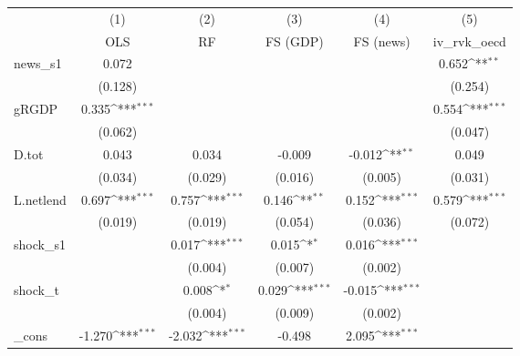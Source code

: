 {
\def\sym#1{\ifmmode^{#1}\else\(^{#1}\)\fi}
\begin{tabular}{l*{5}{c}}
\toprule
            &\multicolumn{1}{c}{(1)}&\multicolumn{1}{c}{(2)}&\multicolumn{1}{c}{(3)}&\multicolumn{1}{c}{(4)}&\multicolumn{1}{c}{(5)}\\
            &\multicolumn{1}{c}{OLS}&\multicolumn{1}{c}{RF}&\multicolumn{1}{c}{FS (GDP)}&\multicolumn{1}{c}{FS (news)}&\multicolumn{1}{c}{iv\_rvk\_oecd}\\
\midrule
news\_s1     &       0.072         &                     &                     &                     &       0.652\sym{**} \\
            &     (0.128)         &                     &                     &                     &     (0.254)         \\
\addlinespace
gRGDP       &       0.335\sym{***}&                     &                     &                     &       0.554\sym{***}\\
            &     (0.062)         &                     &                     &                     &     (0.047)         \\
\addlinespace
D.tot       &       0.043         &       0.034         &      -0.009         &      -0.012\sym{**} &       0.049         \\
            &     (0.034)         &     (0.029)         &     (0.016)         &     (0.005)         &     (0.031)         \\
\addlinespace
L.netlend   &       0.697\sym{***}&       0.757\sym{***}&       0.146\sym{**} &       0.152\sym{***}&       0.579\sym{***}\\
            &     (0.019)         &     (0.019)         &     (0.054)         &     (0.036)         &     (0.072)         \\
\addlinespace
shock\_s1    &                     &       0.017\sym{***}&       0.015\sym{*}  &       0.016\sym{***}&                     \\
            &                     &     (0.004)         &     (0.007)         &     (0.002)         &                     \\
\addlinespace
shock\_t     &                     &       0.008\sym{*}  &       0.029\sym{***}&      -0.015\sym{***}&                     \\
            &                     &     (0.004)         &     (0.009)         &     (0.002)         &                     \\
\addlinespace
\_cons      &      -1.270\sym{***}&      -2.032\sym{***}&      -0.498         &       2.095\sym{***}&                     \\

\end{tabular}}

